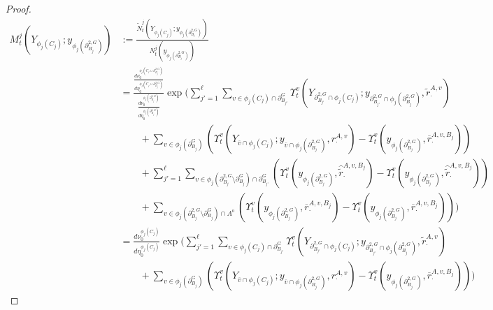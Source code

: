 \documentclass[12pt]{article}
\newcommand{\ov}{\overline}
\newcommand{\defeq}{:=}								%
\newcommand{\gneigh}[2]{\partial^{#1}_{#2}}			%
\newcommand{\dgneigh}[2]{\partial^{2,#1}_{#2}}		%
\newcommand{\cl}[1]{\ov{#1}}						%
\newcommand{\rate}{r}								%
\newcommand{\xg}{y}									%
\newcommand{\vind}[1]{_{#1}}						%
\newcommand{\vpara}[1]{^{#1}}						%
\newcommand{\stpara}[1]{_{#1}}						%
\newcommand{\tpara}[1]{_{#1}}						%
\newcommand{\gvpara}[2]{^{#1,#2}}					%
\newcommand{\psize}{\ell}							%
\newcommand{\Xg}{Y}									%
\newcommand{\brate}{\alt{\rate}}					%
\newcommand{\inte}[1]{{#1}^\mathrm{o}}				%
\newcommand{\alt}[1]{\tilde{#1}}					%
\newcommand{\mm}{\nu}								%
\newcommand{\bgrate}{\ov{\rate}}					%
\newcommand{\bcrate}{\hat{\brate}}					%
\newcommand{\mmm}{\eta}								%
\newcommand{\ds}{\Upsilon}							%
\newcommand{\densen}{N}								%
\newcommand{\denseph}{\alt{N}}						%
\newcommand{\mdense}{M}								%
\newcommand{\gvjpara}[3]{^{#1,#2,#3}}				%
\newcommand{\jpara}[1]{^{#1}}						%
\begin{document}
\begin{proof}
\begin{align*}
\mdense\jpara{j}\tpara{t}(\Xg\vind{\phi_j(C_j)};\xg\vind{\phi_j(\dgneigh{G}{B_j})}) &\defeq \frac{\denseph\jpara{j}\tpara{t}(\Xg\vind{\phi_j(C_j)};\xg\vind{\phi_j(\dgneigh{G}{B_j})})}{\densen\jpara{j}\tpara{t}(\xg\vind{\phi_j(\dgneigh{G}{B_j})})}\\
&= \frac{\frac{d\mm\vpara{\phi_j(C_j\cup \dgneigh{G}{B_j})}\tpara{0}}{d\mmm\vpara{\phi_j(C_j\cup \dgneigh{G}{B_j})}\tpara{0}}}{\frac{d\mm\vpara{\phi_j(\dgneigh{G}{B_j})}\tpara{0}}{d\mmm\vpara{\phi_j(\dgneigh{G}{B_j})}\tpara{0}}}\exp\Bigg(\sum_{j' = 1}^{\psize}\sum_{v \in \phi_j(C_j)\cap\gneigh{G}{B_{j'}}} \ds\vpara{v}\tpara{t}\left(\Xg\vind{\dgneigh{G}{B_{j'}}\cap\phi_j(C_j)};\xg\vind{\dgneigh{G}{B_{j'}}\cap\phi_j(\dgneigh{G}{B_j})},\brate\gvpara{A}{v}\stpara{\cdot}\right)\\
&\hspace{24pt} + \sum_{v \in \phi_j(\gneigh{G}{B_j})} \left(\ds\vpara{v}\tpara{t}\left(\Xg\vind{\cl{v}\cap\phi_j(C_j)};\xg\vind{\cl{v}\cap\phi_j(\dgneigh{G}{B_j})},\rate\gvpara{A}{v}\stpara{\cdot}\right) - \ds\vpara{v}\tpara{t}\left(\xg\vind{\phi_j(\dgneigh{G}{B_j})},\bgrate\gvjpara{A}{v}{B_j}\stpara{\cdot}\right)\right)\\
&\hspace{24pt} +  \sum_{j'=1}^\psize \sum_{v \in \phi_j(\dgneigh{G}{B_j}\setminus\gneigh{G}{B_j})\cap \gneigh{G}{B_{j'}}} \left(\ds\vpara{v}\tpara{t}\left(\xg\vind{\phi_j(\dgneigh{G}{B_j})},\bcrate\gvjpara{A}{v}{B_j}\stpara{\cdot}\right) - \ds\vpara{v}\tpara{t}\left(\xg\vind{\phi_j(\dgneigh{G}{B_j})},\bcrate\gvjpara{A}{v}{B_j}\stpara{\cdot}\right)\right)\\
&\hspace{24pt} +  \sum_{v \in \phi_j(\dgneigh{G}{B_j}\setminus\gneigh{G}{B_j})\cap\inte{A}} \left(\ds\vpara{v}\tpara{t}\left(\xg\vind{\phi_j(\dgneigh{G}{B_j})},\bgrate\gvjpara{A}{v}{B_j}\stpara{\cdot}\right) - \ds\vpara{v}\tpara{t}\left(\xg\vind{\phi_j(\dgneigh{G}{B_j})},\bgrate\gvjpara{A}{v}{B_j}\stpara{\cdot}\right)\right)\Bigg)\\
&= \frac{d\mm\vpara{\phi_j(C_j)}\tpara{0}}{d\mmm\vpara{\phi_j(C_j)}\tpara{0}}\exp\Bigg(\sum_{j' = 1}^{\psize}\sum_{v \in \phi_j(C_j)\cap\gneigh{G}{B_{j'}}} \ds\vpara{v}\tpara{t}\left(\Xg\vind{\dgneigh{G}{B_{j'}}\cap\phi_j(C_j)};\xg\vind{\dgneigh{G}{B_{j'}}\cap\phi_j(\dgneigh{G}{B_j})},\brate\gvpara{A}{v}\stpara{\cdot}\right)\\
&\hspace{24pt} + \sum_{v \in \phi_j(\gneigh{G}{B_j})} \left(\ds\vpara{v}\tpara{t}\left(\Xg\vind{\cl{v}\cap\phi_j(C_j)};\xg\vind{\cl{v}\cap\phi_j(\dgneigh{G}{B_j})},\rate\gvpara{A}{v}\stpara{\cdot}\right) - \ds\vpara{v}\tpara{t}\left(\xg\vind{\phi_j(\dgneigh{G}{B_j})},\bgrate\gvjpara{A}{v}{B_j}\stpara{\cdot}\right)\right)\Bigg)
\end{align*}


\end{proof}
\end{document}
